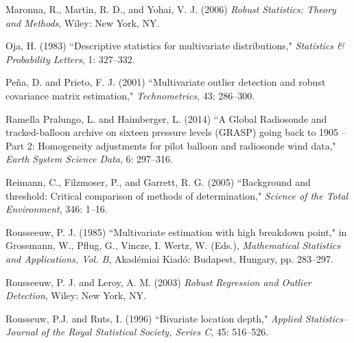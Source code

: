 \documentclass[12pt]{article}
\def\refhg{\hangindent=20pt\hangafter=1}
\def\refmark{\par\vskip 2mm\noindent\refhg}
\def\refhg{\hangindent=20pt\hangafter=1}
\def\refmark{\par\vskip 2mm\noindent\refhg}
\begin{document}
\refmark Maronna, R., Martin, R. D., and Yohai, V. J. (2006) \emph{Robust Statistics: Theory and Methods}, Wiley: New York, NY.

\refmark Oja, H. (1983) ``Descriptive statistics for multivariate distributions," \emph{Statistics \& Probability Letters}, 1: 327--332.



\refmark Pe\~{n}a, D. and Prieto, F. J. (2001) ``Multivariate outlier detection and robust covariance matrix estimation," \emph{Technometrics}, 43:  286--300.


\refmark Ramella Pralungo, L. and Haimberger, L. (2014) ``A Global Radiosonde and tracked-balloon archive on
sixteen pressure levels (GRASP) going back to 1905 -- Part 2: Homogeneity adjustments for pilot balloon and radiosonde wind data," \emph{Earth System Science Data}, 6: 297--316.

\refmark Reimann, C., Filzmoser, P., and Garrett, R. G. (2005) ``Background and threshold: Critical comparison of methods of determination," \emph{Science of the Total Environment}, 346:  1--16.




\refmark Rousseeuw, P. J. (1985) ``Multivariate estimation with high breakdown point," in Grossmann, W., Pflug, G., Vincze, I. Wertz, W. (Eds.), \emph{Mathematical Statistics and Applications, Vol. B}, Akad\'{e}miai Kiad\'{o}: Budapest, Hungary, pp. 283--297.  


\refmark Rousseeuw, P. J. and Leroy, A. M. (2003) \emph{Robust Regression and Outlier Detection}, Wiley: New York, NY.

\refmark Rousseuw, P.J. and Ruts, I. (1996) ``Bivariate location depth," \emph{Applied Statistics--Journal of the Royal Statistical Society, Series C}, 45: 516--526.
\end{document}
